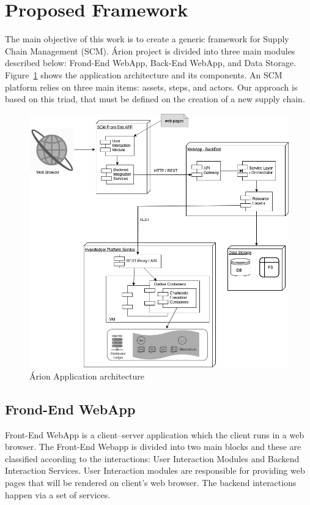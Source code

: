 \section{Proposed Framework} \label{sec:Technical}
The main objective of this work is to create a generic framework for Supply Chain Management (SCM). Árion project is divided into three main modules described below: Frond-End WebApp, Back-End WebApp, and Data Storage. Figure~\ref{fig:detalhamentotecnico} shows the application architecture and its components. An SCM platform relies on three main items: assets, steps, and actors. Our approach is based on this triad, that must be defined on the creation of a new supply chain.

\begin{figure}[ht]
\begin{center}
  \includegraphics[scale=0.4]{images/detalhamentotecnico.png}
\caption{Árion Application architecture}
\label{fig:detalhamentotecnico}
\end{center}
\end{figure}

\subsection{Frond-End WebApp}\label{sec:WebAppFrondEnd}
Front-End WebApp is a client–server application which the client runs in a web browser. The Front-End Webapp is divided into two main blocks and these are classified according to the interactions: User Interaction Modules and Backend Interaction Services. User Interaction modules are responsible for providing web pages that will be rendered on client’s web browser. The backend interactions happen via a set of services.

